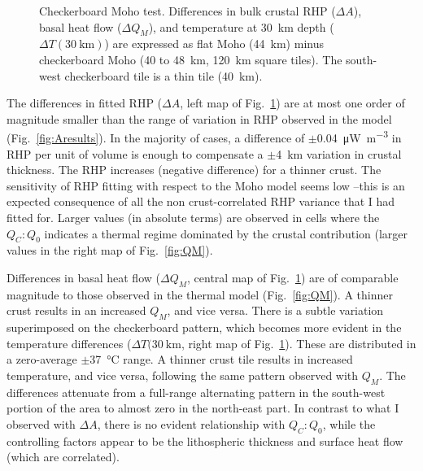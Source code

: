 \begin{figure}
	\begin{adjustbox}{center}
	\end{adjustbox}
	\caption[Checkerboard Moho test.]{Checkerboard Moho test. Differences in bulk crustal RHP ($\Delta A$), basal heat flow ($\Delta Q_M$), and temperature at \SI{30}{\kilo \metre} depth ($\Delta T(\SI{30}{\kilo \metre})$) are expressed as flat Moho (\SI{44}{\kilo \metre}) minus checkerboard Moho (\num{40} to \SI{48}{\kilo \metre}, \SI{120}{\kilo \metre} square tiles). The south-west checkerboard tile is a thin tile (40~\si{\kilo \metre}).}
	\label{fig:CompCheckMoho}
\end{figure}

The differences in fitted RHP ($\Delta A$, left map of Fig.~\ref{fig:CompCheckMoho}) are at most one order of magnitude smaller than the range of variation in RHP observed in the model (Fig.~\ref{fig:Aresults}).
In the majority of cases, a difference of $\pm$\SI{0.04}{\micro \watt \per \cubic \metre} in RHP per unit of volume is enough to compensate a $\pm$\SI{4}{\kilo \metre} variation in crustal thickness.
The RHP increases (negative difference) for a thinner crust.
The sensitivity of RHP fitting with respect to the Moho model seems low --this is an expected consequence of all the non crust-correlated RHP variance that I had fitted for.
Larger values (in absolute terms) are observed in cells where the $Q_C:Q_0$ indicates a thermal regime dominated by the crustal contribution (larger values in the right map of Fig.~\ref{fig:QM}).

Differences in basal heat flow ($\Delta Q_M$, central map of Fig.~\ref{fig:CompCheckMoho}) are of comparable magnitude to those observed in the thermal model (Fig.~\ref{fig:QM}).
A thinner crust results in an increased $Q_M$, and vice versa.
There is a subtle variation superimposed on the checkerboard pattern, which becomes more evident in the temperature differences ($\Delta T(30~\mathrm{km}$, right map of Fig.~\ref{fig:CompCheckMoho}).
These are distributed in a zero-average $\pm$\SI{37}{\celsius} range.
A thinner crust tile results in increased temperature, and vice versa, following the same pattern observed with $Q_M$.
The differences attenuate from a full-range alternating pattern in the south-west portion of the area to almost zero in the north-east part.
In contrast to what I observed with $\Delta A$, there is no evident relationship with $Q_C:Q_0$, while the controlling factors appear to be the lithospheric thickness and surface heat flow (which are correlated).

